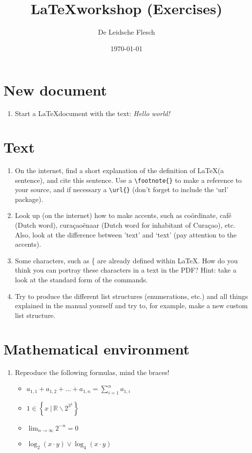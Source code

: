 \documentclass{article}
\begin{document}
\title{\LaTeX workshop (Exercises)}
\author{De Leidsche Flesch}
\date{\today}

\maketitle

\section{New document}
	\begin{enumerate}
		\item Start a \LaTeX document with the text: \emph{Hello world!}
	\end{enumerate}
	
\section{Text}
	\begin{enumerate}
		\item On the internet, find a short explanation of the definition of \LaTeX (a sentence), and cite this sentence. Use a \verb+\footnote{}+ to make a reference to your source, and if necessary a \verb+\url{}+ (don't forget to include the `url' package).
		\item Look up (on the internet) how to make accents, such as co\"ordinate, caf\'e (Dutch word), cura\c{c}ao\"enaar (Dutch word for inhabitant of Cura\c{c}ao), etc. Also, look at the difference between 'text' and `text' (pay attention to the accents).
		\item Some characters, such as \{ are already defined within \LaTeX. How do you think you can portray these characters in a text in the PDF? Hint: take a look at the standard form of the commands.
		\item Try to produce the different list structures (enumerations, etc.) and all things explained in the manual yourself and try to, for example, make a new custom list structure.
	\end{enumerate}


\section{Mathematical environment}
\begin{enumerate}
	\item Reproduce the following formulas, mind the braces!
	\begin{itemize}
		\renewcommand{\labelitemi}{\(\circ\)}
			\item\(a_{1,1} + a_{1,2} + \ldots + a_{1,n} = \displaystyle\sum_{i = 1}^n a_{1,i}\)\\
			\item\( 1 \in \left\{ x~|~\mathbb{R} \backslash 2^{3^4} \right\}\)\\
			\item\(\displaystyle\lim_{n \to \infty} 2^{-n} = 0\)\\
			\item\(\log_2(x\cdot y) \lor \log_4(x\cdot y)\)
		\end{itemize}
		
\end{enumerate}
\end{document}
